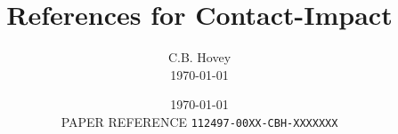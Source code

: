\documentclass[10pt,reqno]{amsart}
\title{References for Contact-Impact}
\author{C.B. Hovey \\ \sc\today}
\date{\today \\ PAPER REFERENCE {\tt 112497-00XX-CBH-XXXXXXX}}
\begin{document}
 
\maketitle


\nocite{
Alart91,
Amero97,
Amero96,
Arora91,
Chabrand95,
Curnier95,
Curnier85,
Francavilla75,
Glowinski89,
Hallquist85,
Heegaard93b,
Heegaard96b,
Kikuchi88,
Klarbring92,
Laursen93,
Parisch89,
Simo92b,
Taylor93,
Wriggers95,
Wriggers90,
Zhong96}








%
\end{document}
